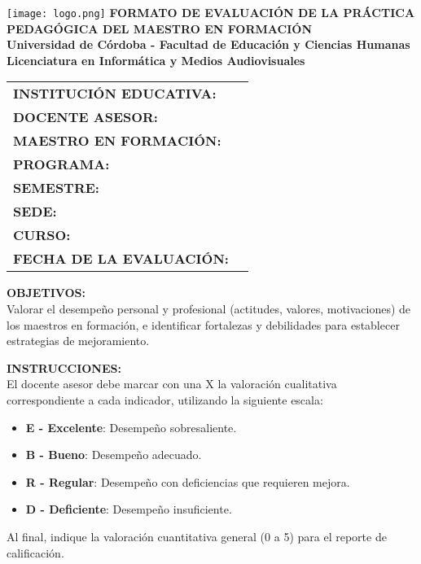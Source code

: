 \documentclass[a4paper,12pt]{article}
\begin{document}
\begin{center}
    \vspace*{1cm}
    \texttt{[image: logo.png]} %
    \vspace{0.5cm}
    \textbf{\Large FORMATO DE EVALUACIÓN DE LA PRÁCTICA PEDAGÓGICA DEL MAESTRO EN FORMACIÓN} \\
    \vspace{0.5cm}
    \textbf{Universidad de Córdoba - Facultad de Educación y Ciencias Humanas} \\
    \textbf{Licenciatura en Informática y Medios Audiovisuales}
\end{center}

\vspace{0.5cm}
\begin{tabularx}{\textwidth}{@{}p{5cm}X@{}}
    \toprule
    \textbf{INSTITUCIÓN EDUCATIVA:} & \hrulefill \\
    \textbf{DOCENTE ASESOR:} & \hrulefill \\
    \textbf{MAESTRO EN FORMACIÓN:} & \hrulefill \\
    \textbf{PROGRAMA:} & \hrulefill \\
    \textbf{SEMESTRE:} & \hrulefill \\
    \textbf{SEDE:} & \hrulefill \\
    \textbf{CURSO:} & \hrulefill \\
    \textbf{FECHA DE LA EVALUACIÓN:} & \hrulefill \\
    \bottomrule
\end{tabularx}

\vspace{0.5cm}
\noindent
\textbf{OBJETIVOS:} \\
Valorar el desempeño personal y profesional (actitudes, valores, motivaciones) de los maestros en formación, e identificar fortalezas y debilidades para establecer estrategias de mejoramiento.

\vspace{0.5cm}
\noindent
\textbf{INSTRUCCIONES:} \\
El docente asesor debe marcar con una X la valoración cualitativa correspondiente a cada indicador, utilizando la siguiente escala: \\
\begin{itemize}[noitemsep]
    \item \textbf{E - Excelente}: Desempeño sobresaliente.
    \item \textbf{B - Bueno}: Desempeño adecuado.
    \item \textbf{R - Regular}: Desempeño con deficiencias que requieren mejora.
    \item \textbf{D - Deficiente}: Desempeño insuficiente.
\end{itemize}
Al final, indique la valoración cuantitativa general (0 a 5) para el reporte de calificación.
\end{document}
